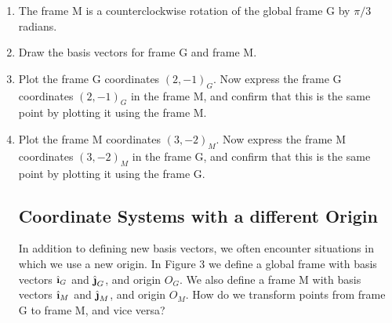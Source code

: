 \documentclass[M3_Night6_Solutions]{subfiles}
\begin{document}
\begin{enumerate}[series=exercises, label=\textbf{Exercise} (\arabic*)]
\item The frame M is a counterclockwise rotation of the global frame G by $\pi/3$ radians.
\be
\item Draw the basis vectors for frame G and frame M.
\item Plot the frame G coordinates $(2,-1)_G$. Now express the frame G coordinates $(2,-1)_G$ in the frame M, and confirm that this is the same point by plotting it using the frame M.
\item Plot the frame M coordinates $(3,-2)_M$. Now express the frame M coordinates $(3,-2)_M$ in the frame G, and confirm that this is the same point by plotting it using the frame G.
\ee
{}
\ee


\subsection{Coordinate Systems with a different Origin}

In addition to defining new basis vectors, we often encounter situations in which we use a new origin. In Figure 3 we define a global frame with basis vectors $\ihat_G$ and $\jhat_G$, and origin $O_G$. We also define a frame M with basis vectors $\ihat_M$ and $\jhat_M$, and origin $O_M$. How do we transform points from frame G to frame M, and vice versa?


\end{enumerate}
\end{document}
